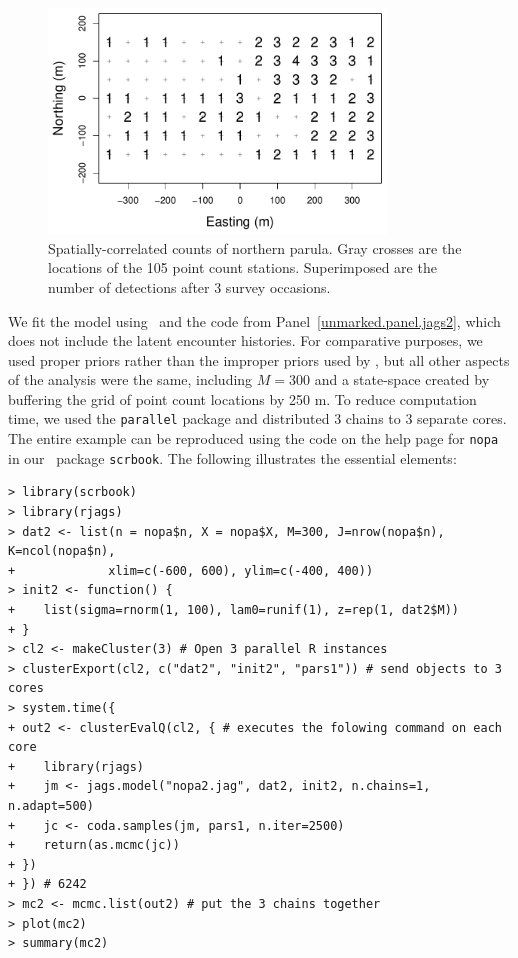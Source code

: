 \begin{figure}
  \centering
  \includegraphics[width=0.8\textwidth]{Ch18-Unmarked/figs/nopaCounts}
  \caption{Spatially-correlated counts of northern parula. Gray
    crosses are the locations of the 105 point count
    stations. Superimposed are the number of detections after 3 survey occasions.}
  \label{fig:nopaDat}
\end{figure}

We fit the model using \jags~and the code from
Panel~\ref{unmarked.panel.jags2}, which does not include the latent
encounter histories. For comparative purposes, we used proper priors
rather than the improper priors used by \citet{chandler_royle:2012}, but
all other aspects of the analysis were the same, including $M=300$ and
a state-space created by buffering the grid of point count
locations by 250 m.
To reduce computation time, we used the \texttt{parallel} package and
distributed 3 chains to 3 separate cores. The entire example can be
reproduced using the code on the help page for \verb+nopa+ in our
\R~package \texttt{scrbook}. The following illustrates the essential
elements:
\begin{small}
\begin{verbatim}
> library(scrbook)
> library(rjags)
> dat2 <- list(n = nopa$n, X = nopa$X, M=300, J=nrow(nopa$n), K=ncol(nopa$n),
+             xlim=c(-600, 600), ylim=c(-400, 400))
> init2 <- function() {
+    list(sigma=rnorm(1, 100), lam0=runif(1), z=rep(1, dat2$M))
+ }
> cl2 <- makeCluster(3) # Open 3 parallel R instances
> clusterExport(cl2, c("dat2", "init2", "pars1")) # send objects to 3 cores
> system.time({
+ out2 <- clusterEvalQ(cl2, { # executes the folowing command on each core
+    library(rjags)
+    jm <- jags.model("nopa2.jag", dat2, init2, n.chains=1, n.adapt=500)
+    jc <- coda.samples(jm, pars1, n.iter=2500)
+    return(as.mcmc(jc))
+ })
+ }) # 6242
> mc2 <- mcmc.list(out2) # put the 3 chains together
> plot(mc2)
> summary(mc2)
\end{verbatim}
\end{small}



